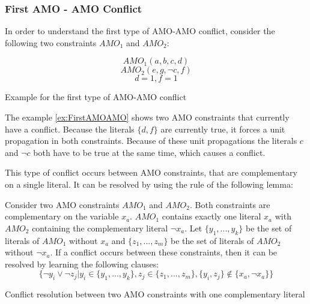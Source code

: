 \subsubsection{First AMO - AMO Conflict}

In order to understand the first type of AMO-AMO conflict, consider the following two constraints $AMO_1$ and $AMO_2$:

\begin{example}
\begin{leftbar}
\begin{displaymath}
AMO_1(a,b,c,d)
\end{displaymath}
\begin{displaymath}
AMO_2(e,g,\neg c,f)
\end{displaymath}
\begin{displaymath}
d = 1, f = 1
\end{displaymath}
\end{leftbar}
\caption{Example for the first type of AMO-AMO conflict}
\label{ex:FirstAMOAMO}
\end{example}

The example \ref{ex:FirstAMOAMO} shows two AMO constraints that currently have a conflict. Because the literals $\{d,f\}$ are currently true, it forces a unit propagation in both constraints. Because of these unit propagations the literals $c$ and $\neg c$ both have to be true at the same time, which causes a conflict.

This type of conflict occurs between AMO constraints, that are complementary on a single literal. It can be resolved by using the rule of the following lemma:

\begin{lemma}
\begin{leftbar}
Consider two AMO constraints $AMO_1$ and $AMO_2$. Both constraints are complementary on the variable $x_a$. $AMO_1$ contains exactly one literal $x_a$ with $AMO_2$ containing the complementary literal $\neg x_a$. Let $\{y_1,...,y_k\}$ be the set of literals of $AMO_1$ without $x_a$ and $\{z_1,...,z_m\}$ be the set of literals of $AMO_2$ without $\neg x_a$. 
If a conflict occurs between these constraints, then it can be resolved by learning the following clauses:
\begin{displaymath}
\{\neg y_i \vee \neg z_j | y_i \in \{y_1,...,y_k\}, z_j \in \{z_1,...,z_m\}, \{y_i,z_j\} \not\in \{x_a, \neg x_a\}\}
\end{displaymath}
\end{leftbar}
\caption{Conflict resolution between two AMO constraints with one complementary literal}
\label{le:oneComplementary}
\end{lemma}

